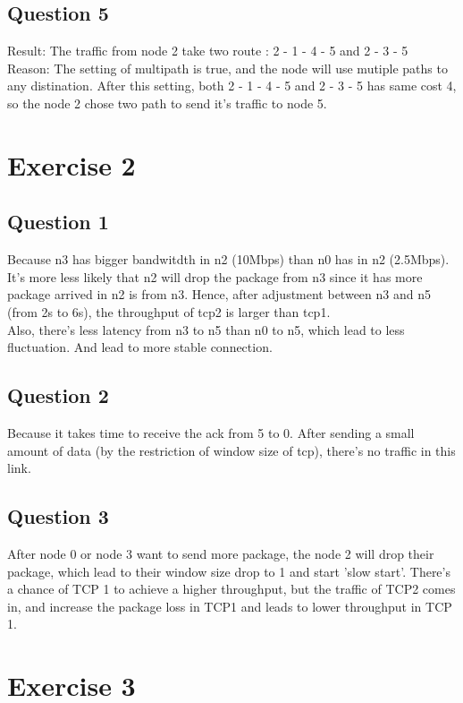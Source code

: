 \documentclass{article}
\begin{document}
\subsection{Question 5}

Result: The traffic from node 2 take two route : 2 - 1 - 4 - 5 and 2 - 3 - 5 \\
Reason: The setting of multipath is true, and the node will use mutiple paths to any distination. After this setting, both 2 - 1 - 4 - 5 and 2 - 3 - 5 has same cost 4, so the node 2 chose two path to send it's traffic to node 5.

\section{Exercise 2}

\subsection{Question 1}

Because n3 has bigger bandwitdth in n2 (10Mbps) than n0 has in n2 (2.5Mbps). It's more less likely that n2 will drop the package from n3 since it has more package arrived in n2 is from n3. Hence, after adjustment between n3 and n5 (from 2s to 6s), the throughput of tcp2 is larger than tcp1. \\
Also, there's less latency from n3 to n5 than n0 to n5, which lead to less fluctuation. And lead to more stable connection. 

\subsection{Question 2}

Because it takes time to receive the ack from 5 to 0. After sending a small amount of data (by the restriction of window size of tcp), there's no traffic in this link. 

\subsection{Question 3}

After node 0 or node 3 want to send more package, the node 2 will drop their package, which lead to their window size drop to 1 and start 'slow start'. There's a chance of TCP 1 to achieve a higher throughput, but the traffic of TCP2 comes in, and increase the package loss in TCP1 and leads to lower throughput in TCP 1. 

\section{Exercise 3}
\end{document}
